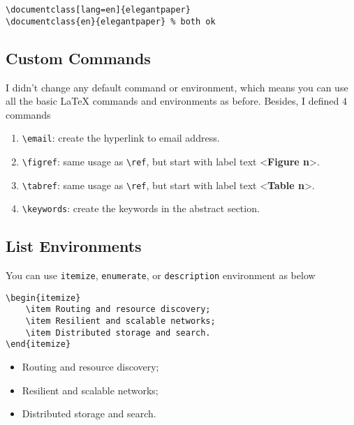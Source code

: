 \documentclass[11pt]{elegantpaper}
\begin{document}
\begin{lstlisting}
\documentclass[lang=en]{elegantpaper}
\documentclass{en}{elegantpaper} % both ok
\end{lstlisting}

\subsection{Custom Commands}

I didn't change any default command or environment, which means you can use all the basic \LaTeX{} commands and environments as before.  Besides, I defined 4 commands
\begin{enumerate}
	\item \lstinline{\email}: create the hyperlink to email address.
	\item \lstinline{\figref}: same usage as \lstinline{\ref}, but start with label text <\textbf{Figure n}>.
	\item \lstinline{\tabref}: same usage as \lstinline{\ref}, but start with label text <\textbf{Table n}>.
	\item \lstinline{\keywords}: create the keywords in the abstract section.
\end{enumerate}{}

\subsection{List Environments}
You can use \lstinline{itemize}, \lstinline{enumerate}, or \lstinline{description} environment as below\\
\begin{minipage}[c]{0.51\linewidth}
\begin{lstlisting}
\begin{itemize}
    \item Routing and resource discovery;
    \item Resilient and scalable networks;
    \item Distributed storage and search.
\end{itemize}
\end{lstlisting}
\end{minipage}
\begin{minipage}[c]{0.48\linewidth}
\begin{itemize}
    \item Routing and resource discovery;
    \item Resilient and scalable networks;
    \item Distributed storage and search.
\end{itemize}
\end{minipage}
\end{document}
